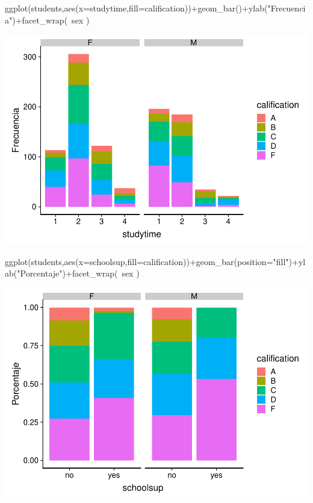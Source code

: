 \documentclass[]{article}
\newenvironment{Shaded}{\begin{snugshade}}{\end{snugshade}}
\newcommand{\DataTypeTok}[1]{\textcolor[rgb]{0.87,0.87,0.75}{#1}}
\newcommand{\KeywordTok}[1]{\textcolor[rgb]{0.94,0.87,0.69}{#1}}
\newcommand{\NormalTok}[1]{\textcolor[rgb]{0.80,0.80,0.80}{#1}}
\newcommand{\OperatorTok}[1]{\textcolor[rgb]{0.94,0.94,0.82}{#1}}
\newcommand{\StringTok}[1]{\textcolor[rgb]{0.80,0.58,0.58}{#1}}
\begin{document}
\begin{Shaded}
\begin{Highlighting}[]
\KeywordTok{ggplot}\NormalTok{(students,}\KeywordTok{aes}\NormalTok{(}\DataTypeTok{x=}\NormalTok{studytime,}\DataTypeTok{fill=}\NormalTok{calification))}\OperatorTok{+}\KeywordTok{geom_bar}\NormalTok{()}\OperatorTok{+}\KeywordTok{ylab}\NormalTok{(}\StringTok{"Frecuencia"}\NormalTok{)}\OperatorTok{+}\KeywordTok{facet_wrap}\NormalTok{(}\OperatorTok{~}\NormalTok{sex )}
\end{Highlighting}
\end{Shaded}

\includegraphics{Practica2_files/figure-latex/unnamed-chunk-24-2.pdf}

\begin{Shaded}
\begin{Highlighting}[]
\KeywordTok{ggplot}\NormalTok{(students,}\KeywordTok{aes}\NormalTok{(}\DataTypeTok{x=}\NormalTok{schoolsup,}\DataTypeTok{fill=}\NormalTok{calification))}\OperatorTok{+}\KeywordTok{geom_bar}\NormalTok{(}\DataTypeTok{position=}\StringTok{"fill"}\NormalTok{)}\OperatorTok{+}\KeywordTok{ylab}\NormalTok{(}\StringTok{"Porcentaje"}\NormalTok{)}\OperatorTok{+}\KeywordTok{facet_wrap}\NormalTok{(}\OperatorTok{~}\NormalTok{sex )}
\end{Highlighting}
\end{Shaded}

\includegraphics{Practica2_files/figure-latex/unnamed-chunk-25-1.pdf}
\end{document}
